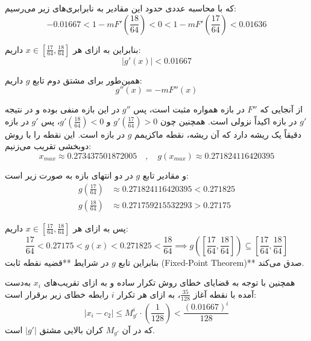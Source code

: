 \documentclass[12pt,a4paper]{article}
\begin{document}
که با محاسبه عددی حدود این مقادیر به نابرابری‌های زیر می‌رسیم:
\begin{equation*}
-0.01667 < 1 - m F'\left(\frac{18}{64}\right) < 0 < 1 - m F'\left(\frac{17}{64}\right) < 0.01636
\end{equation*}

بنابراین به ازای هر $x \in \left[\frac{17}{64}, \frac{18}{64}\right]$ داریم:
\begin{equation*}
|g'(x)| < 0.01667
\end{equation*}

همین‌طور برای مشتق دوم تابع $g$ داریم:
\begin{equation*}
g''(x) = -m F''(x)
\end{equation*}

از آنجایی که $F''$ در بازه همواره مثبت است، پس $g''$ در این بازه منفی بوده و در نتیجه $g'$ در بازه اکیداً نزولی است. همچنین چون $g'\left(\frac{17}{64}\right) > 0$ و $g'\left(\frac{18}{64}\right) < 0$، پس $g'$ در بازه دقیقاً یک ریشه دارد که آن ریشه، نقطه ماکزیمم $g$ در بازه است. این نقطه را با روش دوبخشی تقریب می‌زنیم:
\begin{equation*}
x_{max} \approx 0.273437501872005 \quad,\quad g(x_{max}) \approx 0.271824116420395
\end{equation*}

و مقادیر تابع $g$ در دو انتهای بازه به صورت زیر است:
\begin{align*}
g\left(\frac{17}{64}\right) &\approx 0.271824116420395 < 0.271825 \\
g\left(\frac{18}{64}\right) &\approx 0.271759215532293 > 0.27175
\end{align*}

پس به ازای هر $x \in \left[\frac{17}{64}, \frac{18}{64}\right]$ داریم:
\begin{equation*}
\frac{17}{64} < 0.27175 < g(x) < 0.271825 < \frac{18}{64} \implies g\left(\left[\frac{17}{64}, \frac{18}{64}\right]\right) \subseteq \left[\frac{17}{64}, \frac{18}{64}\right]
\end{equation*}
بنابراین تابع $g$ در شرایط **قضیه نقطه ثابت (Fixed-Point Theorem)** صدق می‌کند.

همچنین با توجه به قضایای خطای روش تکرار ساده و به ازای تقریب‌های $x_i$ به‌دست آمده با نقطه آغاز $\frac{35}{128}$، به ازای هر تکرار $i$ رابطه خطای زیر برقرار است:
\begin{equation*}
|x_i - c_2| \le M_{g'}^i \cdot \left(\frac{1}{128}\right) < \frac{(0.01667)^i}{128}
\end{equation*}
که در آن $M_{g'}$ کران بالایی مشتق $|g'|$ است.
\end{document}
